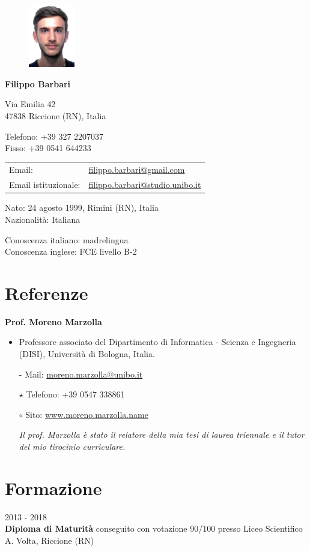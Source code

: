 \documentclass{article}
\newcommand{\years}[1]{{\large #1}\\}
\newcommand{\referenza}[6]{
	\textbf{#1}
	\begin{itemize}
		\setlength\itemsep{0em}
		\item #2
		\item[-] Mail: #3
		\item[$\star$] Telefono: #4
		\item[$\circ$] Sito: #5
		\item[] \textit{#6}
	\end{itemize}
}
\newcommand{\https}[1]{\href{https://#1}{#1}}
\begin{document}
	
	\begin{figure}
		\includegraphics[width=0.18\textwidth]{fototessera}
	\end{figure}
		
	{\LARGE\bfseries Filippo Barbari} %
	\bigskip
	
	Via Emilia 42\\ %
	47838 Riccione (RN), Italia
	\medskip %
	
	Telefono: +39 327 2207037\\
	Fisso: +39 0541 644233
	\medskip
	
	\noindent
	\begin{tabular}{ll}
		Email: & \href{mailto:filippo.barbari@gmail.com}{filippo.barbari@gmail.com}\\
		Email istituzionale: & \href{mailto:filippo.barbari@studio.unibo.it}{filippo.barbari@studio.unibo.it}
	\end{tabular}
	\medskip
	
	Nato: 24 agosto 1999, Rimini (RN), Italia\\ %
	Nazionalità: Italiana %
	\medskip
	
	Conoscenza italiano: madrelingua\\
	Conoscenza inglese: FCE livello B-2
	
	\section*{Referenze}
	
	\referenza{Prof. Moreno Marzolla}
	{Professore associato del Dipartimento di Informatica - Scienza e Ingegneria (DISI), Università di Bologna, Italia.}
	{\href{mailto:moreno.marzolla@unibo.it}{moreno.marzolla@unibo.it}}
	{+39 0547 338861}
	{\https{www.moreno.marzolla.name}}
	{\textit{Il prof. Marzolla è stato il relatore della mia tesi di laurea triennale e il tutor del mio tirocinio curriculare.}}
	
	\section*{Formazione}
	\years{2013 - 2018} \textbf{Diploma di Maturità} conseguito con votazione 90/100 presso Liceo Scientifico A. Volta, Riccione (RN)\\
	
\end{document}
